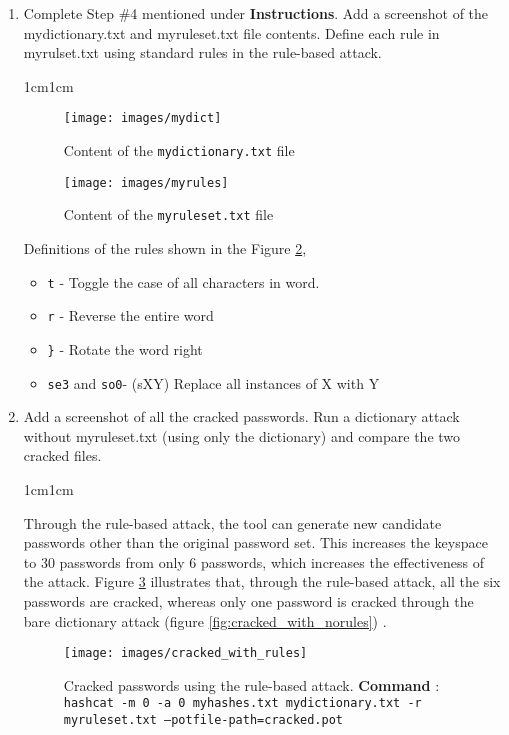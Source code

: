\documentclass[11pt,letterpaper]{article}
\newenvironment{answer}{\em \color{blue} \begin{adjustwidth}{1cm}{1cm}}{\end{adjustwidth}}
\begin{document}
\begin{enumerate}
		\item Complete Step \#4 mentioned under \textbf{Instructions}. Add a screenshot of the mydictionary.txt and myruleset.txt file contents. Define each rule in myrulset.txt using standard rules in the rule-based attack.
		
		\begin{answer}
			\begin{figure}[h]
				\centering
				\texttt{[image: images/mydict]}
				\caption{Content of the {\tt mydictionary.txt} file} \label{fig:mydict}
			\end{figure}
		
			\begin{figure}[h]
				\centering
				\texttt{[image: images/myrules]}
				\caption{Content of the {\tt myruleset.txt} file} \label{fig:myrules}
			\end{figure}
		
		Definitions of the rules shown in the Figure \ref{fig:myrules},
		
		\begin{itemize}
			\item {\tt t} - Toggle the case of all characters in word.
			\item {\tt r} - Reverse the entire word
			\item {\tt \}} - Rotate the word right
			\item {\tt se3} and {\tt so0}- (sXY) Replace all instances of X with Y
		\end{itemize}
		
		\end{answer}
		
		\item Add a screenshot of all the cracked passwords. Run a dictionary attack without myruleset.txt (using only the dictionary) and compare the two cracked files.
		
		\begin{answer}
			
			Through the rule-based attack, the tool can generate new candidate passwords other than the original password set. This increases the keyspace to 30 passwords from only 6 passwords, which increases the effectiveness of the attack. Figure \ref{fig:cracked_with_rules} illustrates that, through the rule-based attack, all the six passwords are cracked, whereas  only one password is cracked through the bare dictionary attack (figure \ref{fig:cracked_with_norules}) .
			
			\begin{figure}[h]
				\centering
				\texttt{[image: images/cracked\_with\_rules]}
				\caption{Cracked passwords using the rule-based attack. \textbf{Command} : {\tt hashcat -m 0 -a 0 myhashes.txt mydictionary.txt -r myruleset.txt --potfile-path=cracked.pot}} \label{fig:cracked_with_rules}
			\end{figure}
			

\end{answer}
\end{enumerate}
\end{document}

